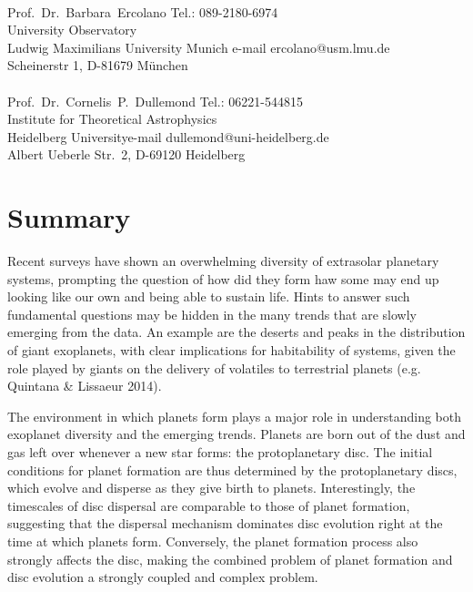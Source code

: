 \documentclass[12pt]{article}
\begin{document}
\\
\noindent Prof.~Dr.~Barbara~Ercolano \hfill Tel.: 089-2180-6974\\
University Observatory  \\
Ludwig Maximilians University Munich \hfill e-mail ercolano@usm.lmu.de\\
Scheinerstr 1, D-81679 M\"unchen\\

\\
\noindent Prof.~Dr.~Cornelis~P.~Dullemond \hfill Tel.: 06221-544815\\
Institute for Theoretical Astrophysics\\
 Heidelberg University\hfill e-mail dullemond@uni-heidelberg.de\\
Albert Ueberle Str.\ 2, D-69120 Heidelberg\\


\pagebreak[4]

\fontsize{11}{12}\selectfont

\section{Summary}

Recent surveys have shown an overwhelming diversity of extrasolar
planetary systems, prompting the question of how did they form haw some may end up
looking like our own and being able to sustain life. Hints to answer
such fundamental questions may be hidden in the many trends that are
slowly emerging from the data. An example are the deserts and peaks in the distribution of
giant exoplanets, with clear implications for habitability of systems,
given the role played by giants on the delivery of volatiles to
terrestrial planets (e.g. Quintana \& Lissaeur 2014). 

The environment
in which planets form plays a major role in understanding both exoplanet
diversity and the emerging trends. Planets are
born out of the dust and gas left over whenever a new star forms: the
protoplanetary disc. The initial conditions for planet formation
are thus determined by the protoplanetary discs, which evolve and disperse as they
give birth to planets. Interestingly, the timescales of disc dispersal
are comparable to those of planet formation, suggesting that the
dispersal mechanism dominates disc evolution right at the time at
which planets form.  Conversely, the planet formation process also
strongly affects the disc, making the combined problem of planet formation
and disc evolution a strongly coupled and complex problem. 
\end{document}
